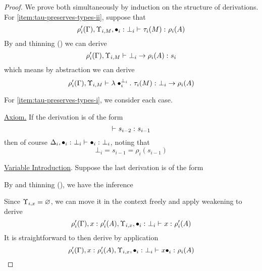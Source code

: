 \documentclass{article}
\begin{document}
\begin{proof}
We prove both simultaneously by induction on the structure of derivations.
For \autoref{item:tau-preserves-types-ii}, suppose that
\[
    \judgment {
        \rho_i'(\Gamma), \Upsilon_{i, M},
        \statement {\bullet_i} {\bot_i}
    }{
        \tau_i(M)
    }{
        \rho_i(A)
    }
\]
By  and thinning () we can derive
\[
    \judgment {
        \rho_i'(\Gamma), \Upsilon_{i, M}
    }{
        \bot_i \to \rho_i(A)
    }{
        s_i
    }
\]
which means by abstraction we can derive
\[
    \judgment {
        \rho_i'(\Gamma), \Upsilon_{i, M}
    }{
        \lambdaT {\bullet_i} {\bot_i} {\tau_i(M)}
    }{
        \bot_i \to \rho_i(A)
    }
\]

For \autoref{item:tau-preserves-types-i}, we consider each case.

\noindent\underline{Axiom.}
If the derivation is of the form
\[
    \judgment{}{s_{i - 2}}{s_{i - 1}}
\]
then of course
$
    \judgment{\Delta_i, \statement {\bullet_i} {\bot_i}}{\bullet_i}{\bot_i}
$,
noting that 
\[
\bot_i = s_{i - 1} = \rho_i(s_{i - 1})
\]

\noindent\underline{Variable Introduction}.
Suppose the last derivation is of the form
\begin{prooftree}
\end{prooftree}
By  and thinning (), we have the inference
 \begin{prooftree}
\end{prooftree}
Since $\Upsilon_{i, x} = \emptyContext$, we can move it in the context freely and apply weakening to derive
\[
    \judgment {
        \rho_i'(\Gamma),
        \statement x {\rho_i'(A)},
        \Upsilon_{i,x},
        \statement {\bullet_i} {\bot_i}
    }{
        x 
    }{
        \rho_i'(A)
    }
\]
It is straightforward to then derive by application
\[
    \judgment {
        \rho_i'(\Gamma),
        \statement x {\rho_i'(A)},
        \Upsilon_{i, x},
        \statement {\bullet_i} {\bot_i}
    }{
        x\bullet_i
    }{
        \rho_i(A)
    }
\]


\end{proof}
\end{document}
